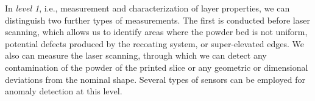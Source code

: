 In \emph{level 1}, i.e., measurement and characterization of layer properties, we can distinguish two further types of measurements. The first is conducted before laser scanning, which allows us to identify areas where the powder bed is not uniform, potential defects produced by the recoating system, or super-elevated edges. We also can measure the laser scanning, through which we can detect any contamination of the powder of the printed slice or any geometric or dimensional deviations from the nominal shape. Several types of sensors can be employed for anomaly detection at this level.
\begin{figure}
    \centering
    \qquad
    \subfloat[\label{fig:offaxialebm}]{
}
\end{figure}
